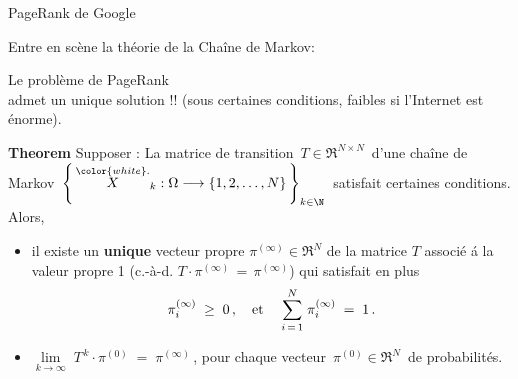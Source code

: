 
\begin{frame}{\Large PageRank de Google}

\footnotesize
Entre en sc\`ene la th\'eorie de la Cha\^ine de Markov:
\pause
\begin{center}
\Large Le probl\`eme de PageRank\\ admet un unique solution !!
\vskip 0.3cm
\small(sous certaines conditions, \pause faibles si l'Internet est \'enorme).
\end{center}

\pause
\vskip 0.1cm
\scriptsize
\textbf{Theorem}
\vskip 0.1cm
Supposer :
\pause La matrice de transition \,$T \in \Re^{N \times N}$\,
\pause d'une cha\^{i}ne de Markov
\,$\left\{\,\overset{{\color{white}.}}{X}_{k} : \Omega \longrightarrow \{1,2,\ldots,N\}\,\right\}_{k\in\N}$\,
\pause satisfait {\color{customRed}certaines conditions}.
\vskip 0.1cm
\pause Alors,
\begin{itemize}
\item
	\pause il existe un \textbf{unique} vecteur propre \;$\pi^{(\infty)} \in \Re^{N}$\; de la matrice $T$
	\pause associ\'e \'a la valeur propre 1
	\pause (\;c.-\`a-d. \;$T \cdot \pi^{(\infty)} \, = \, \pi^{(\infty)}$\;)
	\pause qui satisfait en plus
	\begin{equation*}
	\pi_{i}^{(\infty)} \;\geq\; 0\,,
	\quad\textnormal{et}\quad\;
	\overset{N}{\underset{i\,=\,1}{\sum}}\; \pi_{i}^{(\infty)} \;=\; 1\,.
	\end{equation*}
\item
	\pause $\underset{k\rightarrow\infty}{\lim}\; T^{\,k} \cdot \pi^{(0)} \; = \; \pi^{(\infty)}$\,,\;\;
	pour chaque vecteur \,$\pi^{(0)} \in \Re^{N}$\, de probabilit\'es.
\end{itemize}

\end{frame}
\normalsize


